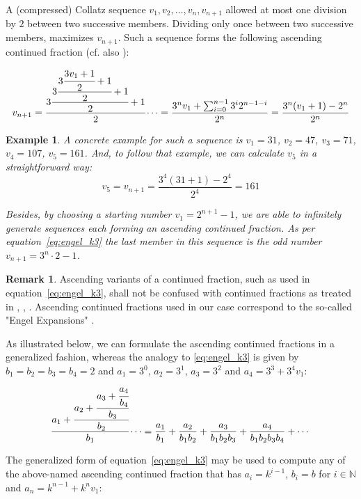 \documentclass[12pt]{amsart}
\newtheorem{example}[theorem]{Example}
\theoremstyle{definition}
\newtheorem{remark}[theorem]{Remark}
\begin{document}
\par\medskip
A (compressed) Collatz sequence $v_1,v_2,\ldots,v_n,v_{n+1}$ allowed at most one division by $2$ between two successive members. Dividing only once between two successive members, maximizes $v_{n+1}$. Such a sequence forms the following ascending continued fraction (cf. also \cite[p.~11]{Ref_Laarhoven}):

\begin{equation}
\label{eq:engel_k3}
v_{n+1}=\cfrac{3\cfrac{3\cfrac{3\cfrac{3v_1+1}{2}+1}{2}+1}{2}+1}{2}\dotsb
=\frac{3^nv_1+\sum_{i=0}^{n-1}3^i2^{n-1-i}}{2^n}
=\frac{3^n(v_1+1)-2^n}{2^n}
\end{equation}

\medskip
\begin{example}
\label{ex:engel_31}
A concrete example for such a sequence is $v_1=31$, $v_2=47$, $v_3=71$, $v_4=107$, $v_5=161$. And, to follow that example, we can calculate $v_5$ in a straightforward way:
\[
v_5=v_{n+1}=\frac{3^4(31+1)-2^4}{2^4}=161
\]

\par\medskip
Besides, by choosing a starting number $v_1=2^{n+1}-1$, we are able to infinitely generate sequences each forming an ascending continued fraction. As per equation~\ref{eq:engel_k3} the last member in this sequence is the odd number $v_{n+1}=3^n\cdot2-1$.
\end{example}

\bigskip
\begin{remark}
Ascending variants of a continued fraction, such as used in equation~\ref{eq:engel_k3}, shall not be confused with continued fractions as treated in \cite{Ref_Moore}, \cite{Ref_Hensley}, \cite{Ref_Borwe_etal}. Ascending continued fractions used in our case correspond to the so-called "Engel Expansions" \cite{Ref_Kraaikamp_Wu}.
\end{remark}

\par\noindent
As illustrated below, we can formulate the ascending continued fractions in a generalized fashion, whereas the analogy to \ref{eq:engel_k3} is given by $b_1=b_2=b_3=b_4=2$ and $a_1=3^0$, $a_2=3^1$, $a_3=3^2$ and $a_4=3^3+3^4v_1$:
\[
\cfrac{a_1+\cfrac{a_2+\cfrac{a_3+\cfrac{a_4}{b_4}}{b_3}}{b_2}}{b_1}\dotsb=\frac{a_1}{b_1}+\frac{a_2}{b_1b_2}+\frac{a_3}{b_1b_2b_3}+\frac{a_4}{b_1b_2b_3b_4}+\cdots
\]

\par\medskip
The generalized form of equation~\ref{eq:engel_k3} may be used to compute any of the above-named ascending continued fraction that has $a_i=k^{i-1}$, $b_i=b$ for $i\in\mathbb{N}$ and $a_n=k^{n-1}+k^nv_1$:
\end{document}
